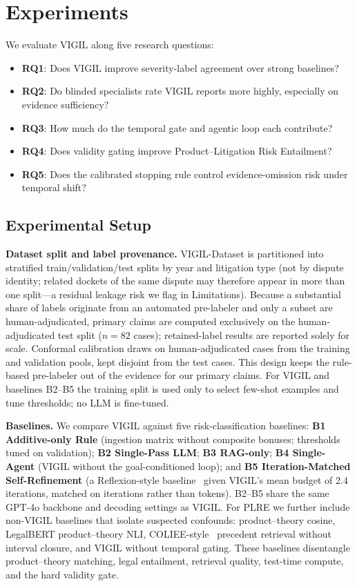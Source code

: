 
\section{Experiments}
\label{sec:evaluation}

We evaluate VIGIL along five research questions:
\begin{itemize}[leftmargin=1.2em,itemsep=1pt,topsep=2pt]
  \item \textbf{RQ1}: Does VIGIL improve severity-label agreement over strong baselines?
  \item \textbf{RQ2}: Do blinded specialists rate VIGIL reports more highly, especially on evidence sufficiency?
  \item \textbf{RQ3}: How much do the temporal gate and agentic loop each contribute?
  \item \textbf{RQ4}: Does validity gating improve Product--Litigation Risk Entailment?
  \item \textbf{RQ5}: Does the calibrated stopping rule control evidence-omission risk under temporal shift?
\end{itemize}

\subsection{Experimental Setup}

\textbf{Dataset split and label provenance.} VIGIL-Dataset is partitioned into stratified train/validation/test splits by year and litigation type (not by dispute identity; related dockets of the same dispute may therefore appear in more than one split---a residual leakage risk we flag in Limitations). Because a substantial share of labels originate from an automated pre-labeler and only a subset are human-adjudicated, primary claims are computed exclusively on the human-adjudicated test split ($n{=}82$ cases); retained-label results are reported solely for scale. Conformal calibration draws on human-adjudicated cases from the training and validation pools, kept disjoint from the test cases. This design keeps the rule-based pre-labeler out of the evidence for our primary claims. For VIGIL and baselines B2--B5 the training split is used only to select few-shot examples and tune thresholds; no LLM is fine-tuned.

\textbf{Baselines.} We compare VIGIL against five risk-classification baselines: \textbf{B1 Additive-only Rule} (ingestion matrix without composite bonuses; thresholds tuned on validation); \textbf{B2 Single-Pass LLM}; \textbf{B3 RAG-only}; \textbf{B4 Single-Agent} (VIGIL without the goal-conditioned loop); and \textbf{B5 Iteration-Matched Self-Refinement} (a Reflexion-style baseline~\citep{shinn2023reflexion} given VIGIL's mean budget of 2.4 iterations, matched on iterations rather than tokens). B2--B5 share the same GPT-4o backbone and decoding settings as VIGIL. For PLRE we further include non-VIGIL baselines that isolate suspected confounds: product--theory cosine, LegalBERT product--theory NLI, COLIEE-style~\citep{rabelo2022coliee} precedent retrieval without interval closure, and VIGIL without temporal gating. These baselines disentangle product--theory matching, legal entailment, retrieval quality, test-time compute, and the hard validity gate.

